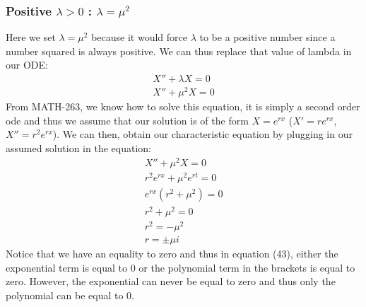 \documentclass[11pt]{article}
\begin{document}
\subsubsection{Positive $\lambda>0$ : $\lambda = \mu^2$}
Here we set $\lambda=\mu^2$ because it would force $\lambda$ to be a positive number since a number squared is always positive. We can thus replace that value of lambda in our ODE:
\begin{align}
	X'' +\lambda X =0\\
	X''+\mu^2X=0
\end{align}
From MATH-263, we know how to solve this equation, it is simply a second order ode and thus we assume that our solution is of the form $X=e^{rx}$ ($X'=re^{rx}$, $X''=r^2e^{rx}$). We can then, obtain our characteristic equation by plugging in our assumed solution in the equation:
\begin{align}
	X'' +\mu^2 X =0\\
	r^2e^{rx} +\mu^2e^{rt}=0\\
	e^{rx}(r^2+\mu^2) = 0\\
	r^2+\mu^2 =0\\
	r^2 = -\mu^2\\
	r = \pm\mu i
\end{align}
Notice that we have an equality to zero and thus in equation (43), either the exponential term is equal to 0 or the polynomial term in the brackets is equal to zero. However, the exponential can never be equal to zero and thus only the polynomial can be equal to 0.
\end{document}
